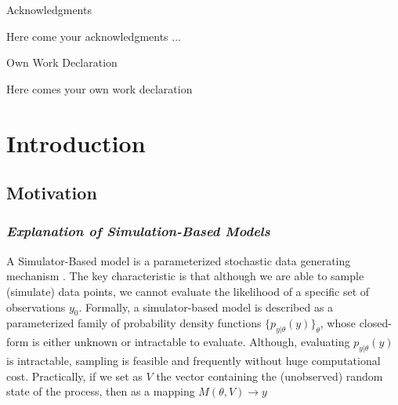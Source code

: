 \documentclass[11pt,twoside]{article}
\numberwithin{Theorem}{section}
\numberwithin{Definition}{section}
\numberwithin{Lemma}{section}
\numberwithin{Algorithm}{section}
\numberwithin{equation}{section}
\begin{document}
\clearpage

\begin{center}
\Large{Acknowledgments}
\end{center}

Here come your acknowledgments ...

\clearpage

\begin{center}
\Large{Own Work Declaration}
\end{center}

Here comes your own work declaration

\cleardoublepage



\pagestyle{plain}
\setcounter{page}{1}

\tableofcontents
\clearpage
\listoftables
\listoffigures
\cleardoublepage

\setcounter{page}{1}

\nocite{*}
% 
\clearpage

\section{Introduction}
\label{sec:introduction}

\subsection{Motivation}

\subsubsection*{\textit{Explanation of Simulation-Based Models}}

A Simulator-Based model is a parameterized stochastic data generating mechanism \cite{Gutmann2016}. The key characteristic is that although we are able to sample (simulate) data points, we cannot evaluate the likelihood of a specific set of observations $y_0$. Formally, a simulator-based model is described as a parameterized family of probability density functions $\{p_{y|\theta}(y)\}_\theta$, whose closed-form is either unknown or intractable to evaluate. Although, evaluating $p_{y|\theta}(y)$ is intractable, sampling is feasible and frequently without huge computational cost. Practically, if we set as $V$ the vector containing the (unobserved) random state of the process, then as a mapping $M(\theta, V) \rightarrow y$
\end{document}
